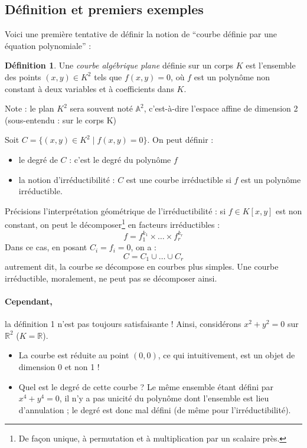 \documentclass[a4paper, 11pt]{article}
\theoremstyle{definition}
\newtheorem{définition}{Définition}
\newcommand{\real}{\mathbb{R}}
\newcommand{\aff}{\mathbb{A}}
\begin{document}
\subsection{Définition et premiers exemples}

Voici une première tentative de définir la notion de \enquote{courbe
  définie par une équation polynomiale} :
\begin{définition}
  Une \emph{courbe algébrique plane} définie sur un corps $K$ est
  l'ensemble des points $(x,y) \in K^2$ tels que $f(x,y) = 0$, où $f$
  est un polynôme non constant à deux variables et à coefficients dans
  $K$.
\end{définition}
Note : le plan $K^2$ sera souvent noté $\aff^2$, c'est-à-dire l'espace
affine de dimension 2 (sous-entendu : sur le corps K)

Soit $C = \{(x,y)\in K^2 \mid f(x,y)=0\}$. On peut définir :
\begin{itemize}
\item le degré de $C$ : c'est le degré du polynôme $f$
\item la notion d'irréductibilité : $C$ est une courbe irréductible si
  $f$ est un polynôme irréductible.
\end{itemize}
Précisions l'interprétation géométrique de l'irréductibilité : si
$f \in K[x,y]$ est non constant, on peut le décomposer\footnote{De
  façon unique, à permutation et à multiplication par un scalaire
  près.} en facteurs irréductibles :
\[ f = f_1^{k_1} \times \ldots \times f_r^{k_r} \]
Dans ce cas, en posant $C_i = {f_i = 0}$, on a :
\[ C = C_1 \cup \ldots \cup C_r \]
autrement dit, la courbe se décompose en courbes plus simples. Une
courbe irréductible, moralement, ne peut pas se décomposer ainsi.

\paragraph{Cependant,} la définition 1 n'est pas toujours satisfaisante !
Ainsi, considérons $x^2 + y^2 = 0$ sur $\real^2$ ($K = \real$).
\begin{itemize}
\item La courbe est réduite au point $(0,0)$, ce qui intuitivement,
  est un objet de dimension 0 et non 1 !
\item Quel est le degré de cette courbe ? Le même ensemble étant
  défini par $x^4 + y^4 = 0$, il n'y a pas unicité du polynôme dont
  l'ensemble est lieu d'annulation ; le degré est donc mal défini (de
  même pour l'irréductibilité).
\end{itemize}
\end{document}
